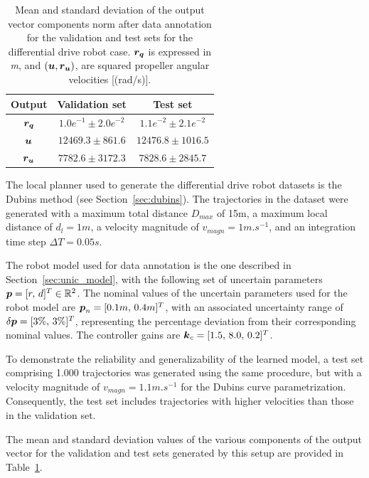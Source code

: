 \begin{table}[t]
    \centering
    \begin{tabular}{ | c | c || c |}
    \hline
      \textbf{Output}  & \textbf{Validation set}  & \textbf{Test set} \\ \hline
    $\boldsymbol{r_q}$ & $1.0e^{-1} \pm 2.0e^{-2}$ & $1.1e^{-2} \pm 2.1e^{-2}$ \\ \hline
    $\boldsymbol{u}$ & $12469.3 \pm 861.6$ & $12476.8 \pm 1016.5$ \\ \hline
    $\boldsymbol{r_u}$ & $7782.6 \pm 3172.3$ & $7828.6 \pm 2845.7$ \\ \hline
\end{tabular}
\caption{
Mean and standard deviation of the output vector components norm after data annotation for the validation and test sets for the differential drive robot case.
$\boldsymbol{r_q}$ is expressed in \emph{m}, and $(\boldsymbol{u}, \boldsymbol{r_u})$, are squared propeller angular velocities [(rad/s)].}
 \label{tab:datas_stats_unic}
\end{table}

The local planner used to generate the differential drive robot datasets is the Dubins method (see Section~\ref{sec:dubins}).
The trajectories in the dataset were generated with a maximum total distance $D_{max}$ of 15m, a maximum local distance of $d_l = 1m$, a velocity magnitude of $v_{magn} = 1 m.s^{-1}$, and an integration time step $\Delta T = 0.05s$. 

The robot model used for data annotation is the one described in Section~\ref{sec:unic_model}, with the following set of uncertain parameters $\boldsymbol{p} = [r, \, d]^T \in \mathbb{R}^{2}$.
The nominal values of the uncertain parameters used for the robot model are  $\boldsymbol{p}_n = [0.1m, \, 0.4m]^T$, with an associated uncertainty range of $\delta\boldsymbol{p} = [3\%, \, 3\%]^T$, representing the percentage deviation from their corresponding nominal values.
The controller gains are $\boldsymbol{k}_c = [1.5, \, 8.0, \, 0.2]^T$.

To demonstrate the reliability and generalizability of the learned model, a test set comprising 1.000 trajectories was generated using the same procedure, but with a velocity magnitude of $v_{magn} = 1.1 m.s^{-1}$ for the Dubins curve parametrization. 
Consequently, the test set includes trajectories with higher velocities than those in the validation set.

The mean and standard deviation values of the various components of the output vector for the validation and test sets generated by this setup are provided in Table~\ref{tab:datas_stats_unic}.

